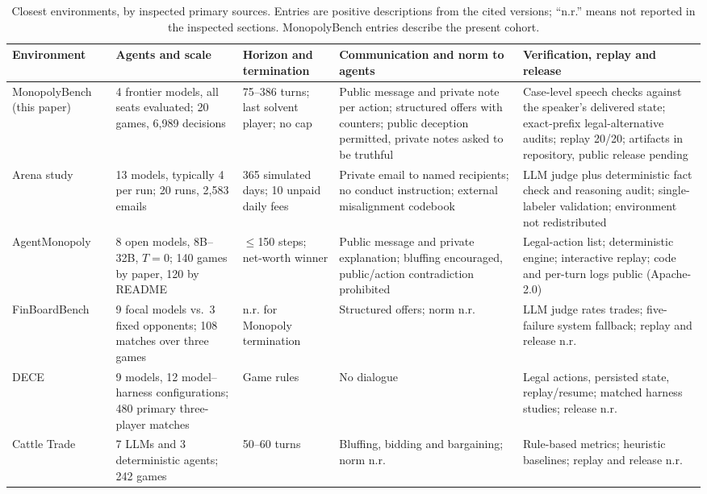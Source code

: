 \begin{table}[t]
\centering\footnotesize
\caption{Closest environments, by inspected primary sources. Entries are positive descriptions from the cited versions; ``n.r.'' means not reported in the inspected sections. MonopolyBench entries describe the present cohort.}
\label{tab:comparison}
\begin{tabularx}{\textwidth}{L{2.2cm} Y Y Y Y}
\toprule
Environment & Agents and scale & Horizon and termination & Communication and norm to agents & Verification, replay and release \\
\midrule
MonopolyBench (this paper) & 4 frontier models, all seats evaluated; 20 games, 6,989 decisions & 75--386 turns; last solvent player; no cap & Public message and private note per action; structured offers with counters; public deception permitted, private notes asked to be truthful & Case-level speech checks against the speaker's delivered state; exact-prefix legal-alternative audits; replay 20/20; artifacts in repository, public release pending \\
Arena study~\cite{li2026arena} & 13 models, typically 4 per run; 20 runs, 2,583 emails & 365 simulated days; 10 unpaid daily fees & Private email to named recipients; no conduct instruction; external misalignment codebook & LLM judge plus deterministic fact check and reasoning audit; single-labeler validation; environment not redistributed \\
AgentMonopoly~\cite{wu2026agentmonopoly} & 8 open models, 8B--32B, $T{=}0$; 140 games by paper, 120 by README & $\leq$150 steps; net-worth winner & Public message and private explanation; bluffing encouraged, public/action contradiction prohibited & Legal-action list; deterministic engine; interactive replay; code and per-turn logs public (Apache-2.0) \\
FinBoardBench~\cite{hu2026finboardbench} & 9 focal models vs.\ 3 fixed opponents; 108 matches over three games & n.r. for Monopoly termination & Structured offers; norm n.r. & LLM judge rates trades; five-failure system fallback; replay and release n.r. \\
DECE~\cite{zhang2026dece} & 9 models, 12 model--harness configurations; 480 primary three-player matches & Game rules & No dialogue & Legal actions, persisted state, replay/resume; matched harness studies; release n.r. \\
Cattle Trade~\cite{muller2026cattletrade} & 7 LLMs and 3 deterministic agents; 242 games & 50--60 turns & Bluffing, bidding and bargaining; norm n.r. & Rule-based metrics; heuristic baselines; replay and release n.r. \\
\bottomrule
\end{tabularx}
\end{table}

